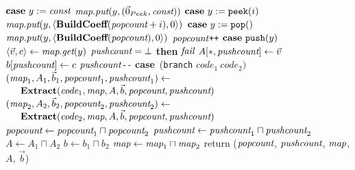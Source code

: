 \begin{algorithm}
\begin{algorithmic}
\STATE $\mbox{\bf case}~y := \mbox{\it const}$
\IND
\STATE $\mbox{\it map}.\mbox{\it put}(y, (\vec 0_{Peek}, \mbox{\it const}))$
\UND
\STATE \vspace{-6pt}
\STATE $\mbox{\bf case}~y := \mbox{\tt peek}(i)$
\IND
\STATE $\mbox{\it map}.\mbox{\it put}(y, \langle{\mbox{\bf BuildCoeff}(\mbox{\it popcount}+i)}, {0}\rangle)$
\UND
\STATE \vspace{-6pt}
\STATE $\mbox{\bf case}~y := \mbox{\tt pop}()$
\IND
\STATE $\mbox{\it map}.\mbox{\it put}(y, \langle{\mbox{\bf BuildCoeff}(\mbox{\it popcount})}, {0}\rangle)$
\STATE $\mbox{\it popcount}$\verb|++|
\UND
\STATE \vspace{-6pt}
\STATE $\mbox{\bf case}~\mbox{\tt push}(y)$
\IND
\STATE $\langle{\vec v}, {c}\rangle \leftarrow \mbox{\it map}.\mbox{\it get}(y)$
 $\mbox{\it pushcount} = \bot$ {\bf then} $\mbox{\it fail}$
\STATE $A[*, \mbox{\it pushcount}] \leftarrow \vec v$
\STATE $b[\mbox{\it pushcount}] \leftarrow c$
\STATE $\mbox{\it pushcount}$\verb|--|
\UND
\STATE \vspace{-6pt}
\STATE \mbox{\bf case}~({\tt branch} $code_1~code_2)$
\IND
\STATE $(\mbox{\it map}_1, A_1, {\vec b_1}, \mbox{\it popcount}_1, \mbox{\it pushcount}_1) \leftarrow$ \\
\verb+   +${\mbox{\bf Extract}}(\mbox{\it code}_1, \mbox{\it map}, A, {\vec b}, \mbox{\it popcount}, \mbox{\it pushcount})$
\STATE $(\mbox{\it map}_2, A_2, {\vec b_2}, \mbox{\it popcount}_2, \mbox{\it pushcount}_2) \leftarrow$ \\ 
\verb+   +${\mbox{\bf Extract}}(\mbox{\it code}_2, \mbox{\it map}, A, {\vec b}, \mbox{\it popcount}, \mbox{\it pushcount})$
\STATE $\mbox{\it popcount} \leftarrow \mbox{\it popcount}_1 \sqcap \mbox{\it popcount}_2$
\STATE $\mbox{\it pushcount} \leftarrow \mbox{\it pushcount}_1 \sqcap \mbox{\it pushcount}_2$
\STATE $A \leftarrow A_1 \sqcap A_2$
\STATE $b \leftarrow b_1 \sqcap b_2$
\STATE $\mbox{\it map} \leftarrow \mbox{\it map}_1 \sqcap \mbox{\it map}_2$
\UND
\UND %
\ENDFOR
\STATE return ($\mbox{\it popcount}$, $\mbox{\it pushcount}$, $\mbox{\it map}$, $A$, ${\vec b}$)
\end{algorithmic}
\end{algorithm}

